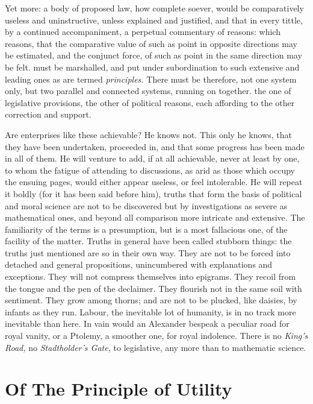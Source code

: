 \documentclass[12pt]{report}
\begin{document}
Yet more: a body of proposed law, how complete soever, would be
comparatively useless and uninstructive, unless explained and justified,
and that in every tittle, by a continued accompaniment, a perpetual
commentary of reasons: which reasons, that the comparative value of such
as point in opposite directions may be estimated, and the conjunct
force, of such as point in the same direction may be felt. must be
marshalled, and put under subordination to such extensive and leading
ones as are termed \emph{principles.} There must be therefore, not one
system only, but two parallel and connected systems, running on
together. the one of legislative provisions, the other of political
reasons, each affording to the other correction and support.

Are enterprises like these achievable? He knows not. This only he knows,
that they have been undertaken, proceeded in, and that some progress has
been made in all of them. He will venture to add, if at all achievable,
never at least by one, to whom the fatigue of attending to discussions,
as arid as those which occupy the ensuing pages, would either appear
useless, or feel intolerable. He will repeat it boldly (for it has been
said before him), truths that form the basis of political and moral
science are not to be discovered but by investigations as severe as
mathematical ones, and beyond all comparison more intricate and
extensive. The familiarity of the terms is a presumption, but is a most
fallacious one, of the facility of the matter. Truths in general have
been called stubborn things: the truths just mentioned are so in their
own way. They are not to be forced into detached and general
propositions, unincumbered with explanations and exceptions. They will
not compress themselves into epigrams. They recoil from the tongue and
the pen of the declaimer. They flourish not in the same soil with
sentiment. They grow among thorns; and are not to be plucked, like
daisies, by infants as they run. Labour, the inevitable lot of humanity,
is in no track more inevitable than here. In vain would an Alexander
bespeak a peculiar road for royal vanity, or a Ptolemy, a smoother one,
for royal indolence. There is no \emph{King's Road,} no
\emph{Stadtholder's Gate,} to legislative, any more than to mathematic
science.

\titlespacing{\chapter}{0mm}{-2em}{1em}
\chapter{Of The Principle of Utility}
\end{document}
